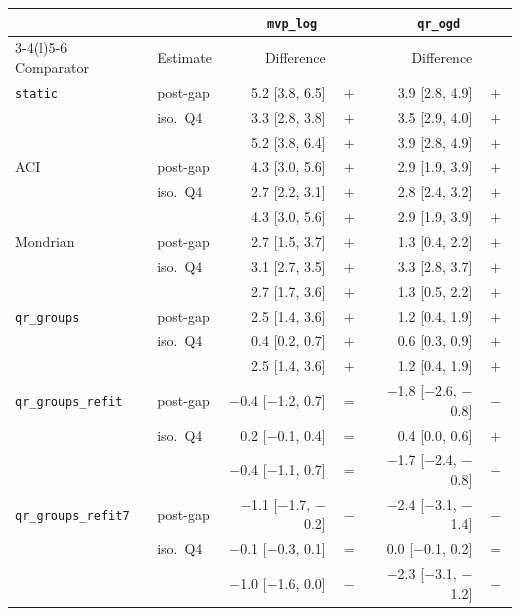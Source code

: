 \begin{tabular}{@{}llrcrc@{}}
\toprule
 & & \multicolumn{2}{c}{\texttt{mvp\_log}} & \multicolumn{2}{c}{\texttt{qr\_ogd}} \\
\cmidrule(lr){3-4}\cmidrule(l){5-6}
Comparator & Estimate & Difference & & Difference & \\
\midrule
\texttt{static} & post-gap & 5.2 [3.8, 6.5] & $+$ & 3.9 [2.8, 4.9] & $+$ \\
 & iso.\ Q4 & 3.3 [2.8, 3.8] & $+$ & 3.5 [2.9, 4.0] & $+$ \\
 & \Dbar{} & 5.2 [3.8, 6.4] & $+$ & 3.9 [2.8, 4.9] & $+$ \\
\addlinespace[2pt]
ACI & post-gap & 4.3 [3.0, 5.6] & $+$ & 2.9 [1.9, 3.9] & $+$ \\
 & iso.\ Q4 & 2.7 [2.2, 3.1] & $+$ & 2.8 [2.4, 3.2] & $+$ \\
 & \Dbar{} & 4.3 [3.0, 5.6] & $+$ & 2.9 [1.9, 3.9] & $+$ \\
\addlinespace[2pt]
Mondrian & post-gap & 2.7 [1.5, 3.7] & $+$ & 1.3 [0.4, 2.2] & $+$ \\
 & iso.\ Q4 & 3.1 [2.7, 3.5] & $+$ & 3.3 [2.8, 3.7] & $+$ \\
 & \Dbar{} & 2.7 [1.7, 3.6] & $+$ & 1.3 [0.5, 2.2] & $+$ \\
\addlinespace[2pt]
\texttt{qr\_groups} & post-gap & 2.5 [1.4, 3.6] & $+$ & 1.2 [0.4, 1.9] & $+$ \\
 & iso.\ Q4 & 0.4 [0.2, 0.7] & $+$ & 0.6 [0.3, 0.9] & $+$ \\
 & \Dbar{} & 2.5 [1.4, 3.6] & $+$ & 1.2 [0.4, 1.9] & $+$ \\
\addlinespace[2pt]
\texttt{qr\_groups\_refit} & post-gap & $-$0.4 [$-$1.2, 0.7] & $=$ & $-$1.8 [$-$2.6, $-$0.8] & $-$ \\
 & iso.\ Q4 & 0.2 [$-$0.1, 0.4] & $=$ & 0.4 [0.0, 0.6] & $+$ \\
 & \Dbar{} & $-$0.4 [$-$1.1, 0.7] & $=$ & $-$1.7 [$-$2.4, $-$0.8] & $-$ \\
\addlinespace[2pt]
\texttt{qr\_groups\_refit7} & post-gap & $-$1.1 [$-$1.7, $-$0.2] & $-$ & $-$2.4 [$-$3.1, $-$1.4] & $-$ \\
 & iso.\ Q4 & $-$0.1 [$-$0.3, 0.1] & $=$ & 0.0 [$-$0.1, 0.2] & $=$ \\
 & \Dbar{} & $-$1.0 [$-$1.6, 0.0] & $-$ & $-$2.3 [$-$3.1, $-$1.2] & $-$ \\
\bottomrule
\end{tabular}
